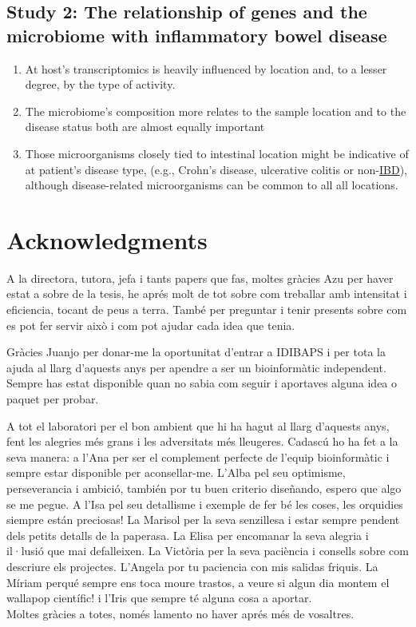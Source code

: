 \documentclass[
  12pt,
  a4paper,
  twoside,
  openright]{book}
\providecommand{\tightlist}{%
  \setlength{\itemsep}{0pt}\setlength{\parskip}{0pt}}
\begin{document}
\hypertarget{study-2-the-relationship-of-genes-and-the-microbiome-with-inflammatory-bowel-disease}{%
\section{Study 2: The relationship of genes and the microbiome with inflammatory bowel disease}\label{study-2-the-relationship-of-genes-and-the-microbiome-with-inflammatory-bowel-disease}}

\begin{enumerate}
\def\labelenumi{\arabic{enumi}.}
\tightlist
\item
  At host's transcriptomics is heavily influenced by location and, to a lesser degree, by the type of activity.
\item
  The microbiome's composition more relates to the sample location and to the disease status both are almost equally important
\item
  Those microorganisms closely tied to intestinal location might be indicative of at patient's disease type, (e.g., Crohn's disease, ulcerative colitis or non-\protect\hyperlink{acronyms_IBD}{IBD}), although disease-related microorganisms can be common to all all locations.
\end{enumerate}

\hypertarget{acknowledgments}{%
\chapter{Acknowledgments}\label{acknowledgments}}

A la directora, tutora, jefa i tants papers que fas, moltes gràcies Azu per haver estat a sobre de la tesis, he aprés molt de tot sobre com treballar amb intensitat i eficiencia, tocant de peus a terra.
També per preguntar i tenir presents sobre com es pot fer servir això i com pot ajudar cada idea que tenia.

Gràcies Juanjo per donar-me la oportunitat d'entrar a IDIBAPS i per tota la ajuda al llarg d'aquests anys per apendre a ser un bioinformàtic independent.
Sempre has estat disponible quan no sabia com seguir i aportaves alguna idea o paquet per probar.

A tot el laboratori per el bon ambient que hi ha hagut al llarg d'aquests anys, fent les alegries més grans i les adversitats més lleugeres.
Cadascú ho ha fet a la seva manera: a l'Ana per ser el complement perfecte de l'equip bioinformàtic i sempre estar disponible per aconsellar-me.
L'Alba pel seu optimisme, perseverancia i ambició, también por tu buen criterio diseñando, espero que algo se me pegue.
A l'Isa pel seu detallisme i exemple de fer bé les coses, les orquidies siempre están preciosas!
La Marisol per la seva senzillesa i estar sempre pendent dels petits detalls de la paperasa.
La Elisa per encomanar la seva alegria i il·lusió que mai defalleixen.
La Victòria per la seva paciència i consells sobre com descriure els projectes.
L'Angela por tu paciencia con mis salidas friquis.
La Míriam perqué sempre ens toca moure trastos, a veure si algun dia montem el wallapop científic! i l'Iris que sempre té alguna cosa a aportar.\\
Moltes gràcies a totes, només lamento no haver aprés més de vosaltres.
\end{document}
